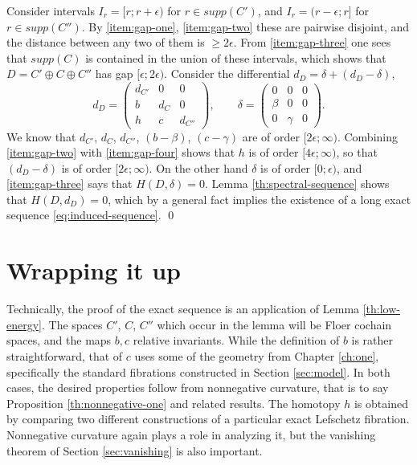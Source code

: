 \documentclass[10pt,letterpaper]{article}
\begin{document}
\proof Consider intervals $I_r = [r;r+\epsilon)$ for $r \in supp(C')$, and $I_r
= (r-\epsilon;r]$ for $r \in supp(C'')$. By \ref{item:gap-one},
\ref{item:gap-two} these are pairwise disjoint, and the distance between any
two of them is $\geq 2\epsilon$. From \ref{item:gap-three} one sees that
$supp(C)$ is contained in the union of these intervals, which shows that $D =
C' \oplus C \oplus C''$ has gap $[\epsilon;2\epsilon)$. Consider the
differential $d_D = \delta + (d_D-\delta)$,
\[
d_D =
\begin{pmatrix}
d_{C'} & 0 & 0 \\ b & d_C & 0 \\ h & c & d_{C''}
\end{pmatrix}, \qquad
\delta =
\begin{pmatrix}
0 & 0 & 0 \\ \beta & 0 & 0 \\ 0 & \gamma & 0
\end{pmatrix}.
\]
We know that $d_{C'}$, $d_C$, $d_{C''}$, $(b-\beta)$, $(c-\gamma)$ are of order
$[2\epsilon;\infty)$. Combining \ref{item:gap-two} with \ref{item:gap-four}
shows that $h$ is of order $[4\epsilon;\infty)$, so that $(d_D-\delta)$ is of
order $[2\epsilon;\infty)$. On the other hand $\delta$ is of order
$[0;\epsilon)$, and \ref{item:gap-three} says that $H(D,\delta) = 0$. Lemma
\ref{th:spectral-sequence} shows that $H(D,d_D) = 0$, which by a general fact
implies the existence of a long exact sequence \eqref{eq:induced-sequence}.
\qed

\newpage
%

\section{Wrapping it up\label{ch:three}}

Technically, the proof of the exact sequence is an application of Lemma
\ref{th:low-energy}. The spaces $C'$, $C$, $C''$ which occur in the lemma will
be Floer cochain spaces, and the maps $b,c$ relative invariants. While the
definition of $b$ is rather straightforward, that of $c$ uses some of the
geometry from Chapter \ref{ch:one}, specifically the standard fibrations
constructed in Section \ref{sec:model}. In both cases, the desired properties
follow from nonnegative curvature, that is to say Proposition
\ref{th:nonnegative-one} and related results. The homotopy $h$ is obtained by
comparing two different constructions of a particular exact Lefschetz
fibration. Nonnegative curvature again plays a role in analyzing it, but the
vanishing theorem of Section \ref{sec:vanishing} is also important.
\end{document}
